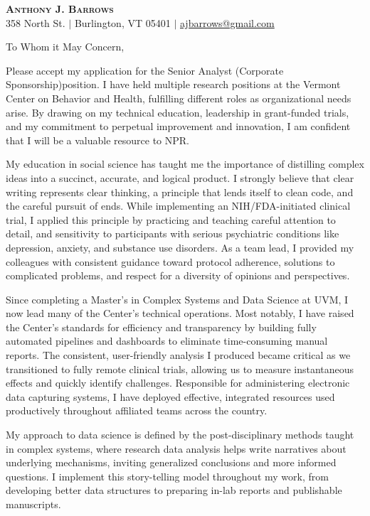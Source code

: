 \documentclass[letterpaper,11pt]{article}
\newcommand{\company}{NPR}
\newcommand{\position}{Senior Analyst (Corporate Sponsorship)}
\begin{document}
\begin{center}
    \textbf{\Huge \scshape Anthony J. Barrows} \\ \vspace{3pt}
    \small 358 North St. $|$
    \small Burlington, VT 05401 $|$
    \href{mailto:ajbarrows@gmail.com}{ajbarrows@gmail.com}
\end{center}
\vspace{5mm}
	
	To Whom it May Concern,
	\vspace{3mm}
	
	Please accept my application for the \position \space position. I have held multiple research positions at the Vermont Center on Behavior and Health, fulfilling different roles as organizational needs arise. By drawing on my technical education, leadership in grant-funded trials, and my commitment to perpetual improvement and innovation, I am confident that I will be a valuable resource to \company.
	
	
	My education in social science has taught me the importance of distilling complex ideas into a succinct, accurate, and logical product. I strongly believe that clear writing represents clear thinking, a principle that lends itself to clean code, and the careful pursuit of ends. While implementing an NIH/FDA-initiated clinical trial, I applied this principle by practicing and teaching careful attention to detail, and sensitivity to participants with serious psychiatric conditions like depression, anxiety, and substance use disorders. As a team lead, I provided my colleagues with consistent guidance toward protocol adherence, solutions to complicated problems, and respect for a diversity of opinions and perspectives.
	
	
	Since completing a Master's in Complex Systems and Data Science at UVM, I now lead many of the Center's technical operations. Most notably, I have raised the Center’s standards for efficiency and transparency by building fully automated pipelines and dashboards to eliminate time-consuming manual reports. The consistent, user-friendly analysis I produced became critical as we transitioned to fully remote clinical trials, allowing us to measure instantaneous effects and quickly identify challenges. Responsible for administering electronic data capturing systems, I have deployed effective, integrated resources used productively throughout affiliated teams across the country.
	
	My approach to data science is defined by the post-disciplinary methods taught in complex systems, where research data analysis helps write narratives about underlying mechanisms, inviting generalized conclusions and more informed questions. I implement this story-telling model throughout my work, from developing better data structures to preparing in-lab reports and publishable manuscripts.
	
\end{document}
